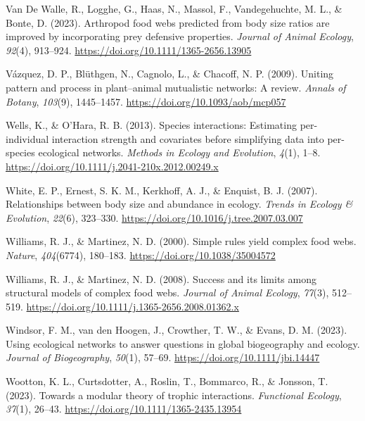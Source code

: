 \documentclass[
]{article}
\newlength{\cslhangindent}
\newenvironment{CSLReferences}[2] %
 {\begin{list}{}{%
  \setlength{\itemindent}{0pt}
  \setlength{\leftmargin}{0pt}
  \setlength{\parsep}{0pt}
  \ifodd #1
   \setlength{\leftmargin}{\cslhangindent}
   \setlength{\itemindent}{-1\cslhangindent}
  \fi
  \setlength{\itemsep}{#2\baselineskip}}}
 {\end{list}}
\begin{document}
\begin{CSLReferences}{1}{0}
Van De Walle, R., Logghe, G., Haas, N., Massol, F., Vandegehuchte, M.
L., \& Bonte, D. (2023). Arthropod food webs predicted from body size
ratios are improved by incorporating prey defensive properties.
\emph{Journal of Animal Ecology}, \emph{92}(4), 913--924.
\url{https://doi.org/10.1111/1365-2656.13905}

Vázquez, D. P., Blüthgen, N., Cagnolo, L., \& Chacoff, N. P. (2009).
Uniting pattern and process in plant--animal mutualistic networks: A
review. \emph{Annals of Botany}, \emph{103}(9), 1445--1457.
\url{https://doi.org/10.1093/aob/mcp057}

Wells, K., \& O'Hara, R. B. (2013). Species interactions: Estimating
per-individual interaction strength and covariates before simplifying
data into per-species ecological networks. \emph{Methods in Ecology and
Evolution}, \emph{4}(1), 1--8.
\url{https://doi.org/10.1111/j.2041-210x.2012.00249.x}

White, E. P., Ernest, S. K. M., Kerkhoff, A. J., \& Enquist, B. J.
(2007). Relationships between body size and abundance in ecology.
\emph{Trends in Ecology \& Evolution}, \emph{22}(6), 323--330.
\url{https://doi.org/10.1016/j.tree.2007.03.007}

Williams, R. J., \& Martinez, N. D. (2000). Simple rules yield complex
food webs. \emph{Nature}, \emph{404}(6774), 180--183.
\url{https://doi.org/10.1038/35004572}

Williams, R. J., \& Martinez, N. D. (2008). Success and its limits among
structural models of complex food webs. \emph{Journal of Animal
Ecology}, \emph{77}(3), 512--519.
\url{https://doi.org/10.1111/j.1365-2656.2008.01362.x}

Windsor, F. M., van den Hoogen, J., Crowther, T. W., \& Evans, D. M.
(2023). Using ecological networks to answer questions in global
biogeography and ecology. \emph{Journal of Biogeography}, \emph{50}(1),
57--69. \url{https://doi.org/10.1111/jbi.14447}

Wootton, K. L., Curtsdotter, A., Roslin, T., Bommarco, R., \& Jonsson,
T. (2023). Towards a modular theory of trophic interactions.
\emph{Functional Ecology}, \emph{37}(1), 26--43.
\url{https://doi.org/10.1111/1365-2435.13954}


\end{CSLReferences}
\end{document}
